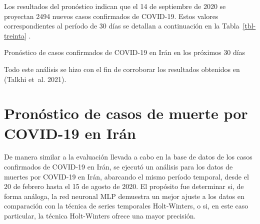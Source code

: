 \documentclass[
  letterpaper,
  DIV=11,
  numbers=noendperiod]{scrreport}
\theoremstyle{plain}
\theoremstyle{definition}
\theoremstyle{definition}
\theoremstyle{plain}
\theoremstyle{remark}
\begin{document}
Los resultados del pronóstico indican que el 14 de septiembre de 2020 se
proyectan 2494 nuevos casos confirmados de COVID-19. Estos valores
correspondientes al período de 30 días se detallan a continuación en la
Tabla~\ref{tbl-treinta} .

\begin{table}

\caption{\label{tbl-treinta}Pronóstico de casos confirmados de COVID-19
en Irán en los próximos 30 días}


\end{table}%

Todo este análisis se hizo con el fin de corroborar los resultados
obtenidos en (Talkhi et~al. 2021).

\chapter{Pronóstico de casos de muerte por COVID-19 en
Irán}\label{pronuxf3stico-de-casos-de-muerte-por-covid-19-en-iruxe1n}

De manera similar a la evaluación llevada a cabo en la base de datos de
los casos confirmados de COVID-19 en Irán, se ejecutó un análisis para
los datos de muertes por COVID-19 en Irán, abarcando el mismo período
temporal, desde el 20 de febrero hasta el 15 de agosto de 2020. El
propósito fue determinar si, de forma análoga, la red neuronal MLP
demuestra un mejor ajuste a los datos en comparación con la técnica de
series temporales Holt-Winters, o si, en este caso particular, la
técnica Holt-Winters ofrece una mayor precisión.
\end{document}
